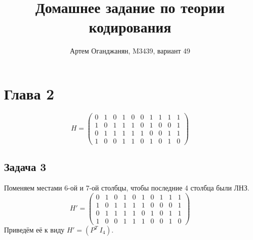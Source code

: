 \documentclass{article}
\title{Домашнее задание по теории кодирования}
\author{Артем Оганджанян, M3439, вариант 49}
\date{}
\begin{document}
\maketitle

\section{\texorpdfstring{Глава 2}{Section 2}}
\[
    H =
    \begin{pmatrix}
        0 & 1 & 0 & 1 & 0 & 0 & 1 & 1 & 1 & 1 \\
        1 & 0 & 1 & 1 & 1 & 0 & 1 & 0 & 0 & 1 \\
        0 & 1 & 1 & 1 & 1 & 1 & 0 & 0 & 1 & 1 \\
        1 & 0 & 0 & 1 & 1 & 0 & 1 & 0 & 1 & 0
    \end{pmatrix}
\]
\subsection{\texorpdfstring{Задача 3}{Task 3}}
Поменяем местами 6-ой и 7-ой столбцы, чтобы последние 4 столбца были ЛНЗ.
\[
    H' =
    \begin{pmatrix}
        0 & 1 & 0 & 1 & 0 & 1 & 0 & 1 & 1 & 1 \\
        1 & 0 & 1 & 1 & 1 & 1 & 0 & 0 & 0 & 1 \\
        0 & 1 & 1 & 1 & 1 & 0 & 1 & 0 & 1 & 1 \\
        1 & 0 & 0 & 1 & 1 & 1 & 0 & 0 & 1 & 0
    \end{pmatrix}
\]
Приведём её к виду $H' = (P^T\ I_4)$.
\end{document}
